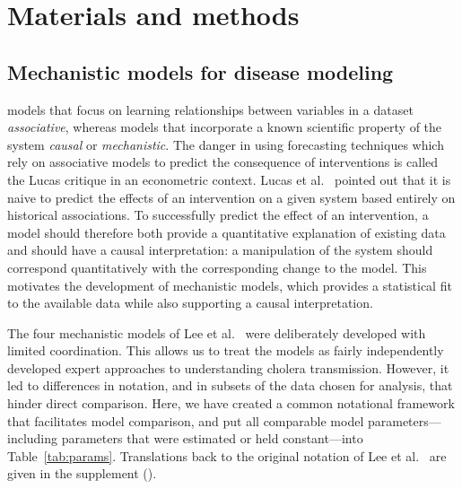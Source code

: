 \documentclass[10pt,letterpaper]{article}\usepackage[]{graphicx}\usepackage[table]{xcolor}
\begin{document}
\section*{Materials and methods}
\subsection*{Mechanistic models for disease modeling}

\new{\editMechModels}

 models that focus on learning relationships between variables in a dataset   {\it associative}, whereas models that incorporate a known scientific property of the system   {\it causal} or {\it mechanistic}.
The danger in using forecasting techniques which rely on associative models to predict the consequence of interventions is called the Lucas critique in an econometric context.
Lucas et al.~\cite{lucas76} pointed out that it is naive to predict the effects of an intervention on a given system based entirely on historical associations.
To successfully predict the effect of an intervention, a model should therefore both provide a quantitative explanation of existing data and should have a causal interpretation: a manipulation of the system should correspond quantitatively with the corresponding change to the model.
This motivates the development of mechanistic models, which provides a statistical fit to the available data while also supporting a causal interpretation.

The four mechanistic models of Lee et al.~\cite{lee20} were deliberately developed with limited coordination.
This allows us to treat the models as fairly independently developed expert approaches to understanding cholera transmission.
However, it led to differences in notation, and in subsets of the data chosen for analysis, that hinder direct comparison.
Here, we have created a common notational framework that facilitates model comparison, and put all comparable model parameters---including parameters that were estimated or held constant---into Table~\ref{tab:params}.
Translations back to the original notation of Lee et al.~\cite{lee20} are given in the supplement ().
\end{document}
